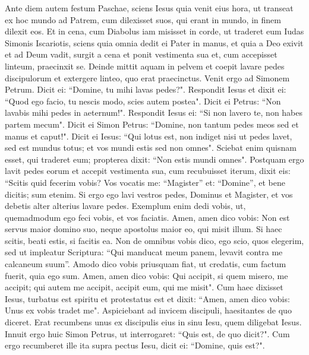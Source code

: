 \begin{biblechapter} 
\verse Ante diem autem festum Paschae, sciens Iesus quia venit eius hora, ut transeat ex hoc mundo ad Patrem, cum dilexisset suos, qui erant in mundo, in finem dilexit eos. 
\verse Et in cena, cum Diabolus iam misisset in corde, ut traderet eum Iudas Simonis Iscariotis, 
\verse sciens quia omnia dedit ei Pater in manus, et quia a Deo exivit et ad Deum vadit, 
\verse surgit a cena et ponit vestimenta sua et, cum accepisset linteum, praecinxit se. 
\verse Deinde mittit aquam in pelvem et coepit lavare pedes discipulorum et extergere linteo, quo erat praecinctus. 
\verse Venit ergo ad Simonem Petrum. Dicit ei: “Domine, tu mihi lavas pedes?". 
\verse Respondit Iesus et dixit ei: “Quod ego facio, tu nescis modo, scies autem postea". 
\verse Dicit ei Petrus: “Non lavabis mihi pedes in aeternum!". Respondit Iesus ei: “Si non lavero te, non habes partem mecum". 
\verse Dicit ei Simon Petrus: “Domine, non tantum pedes meos sed et manus et caput!". 
\verse Dicit ei Iesus: “Qui lotus est, non indiget nisi ut pedes lavet, sed est mundus totus; et vos mundi estis sed non omnes". 
\verse Sciebat enim quisnam esset, qui traderet eum; propterea dixit: “Non estis mundi omnes". 
\verse Postquam ergo lavit pedes eorum et accepit vestimenta sua, cum recubuisset iterum, dixit eis: “Scitis quid fecerim vobis? 
\verse Vos vocatis me: “Magister” et: “Domine”, et bene dicitis; sum etenim. 
\verse Si ergo ego lavi vestros pedes, Dominus et Magister, et vos debetis alter alterius lavare pedes.  
\verse Exemplum enim dedi vobis, ut, quemadmodum ego feci vobis, et vos faciatis.  
\verse Amen, amen dico vobis: Non est servus maior domino suo, neque apostolus maior eo, qui misit illum. 
\verse Si haec scitis, beati estis, si facitis ea. 
\verse Non de omnibus vobis dico, ego scio, quos elegerim, sed ut impleatur Scriptura: “Qui manducat meum panem, levavit contra me calcaneum suum”. 
\verse Amodo dico vobis priusquam fiat, ut credatis, cum factum fuerit, quia ego sum. 
\verse Amen, amen dico vobis: Qui accipit, si quem misero, me accipit; qui autem me accipit, accipit eum, qui me misit". 
\verse Cum haec dixisset Iesus, turbatus est spiritu et protestatus est et dixit: “Amen, amen dico vobis: Unus ex vobis tradet me". 
\verse Aspiciebant ad invicem discipuli, haesitantes de quo diceret. 
\verse Erat recumbens unus ex discipulis eius in sinu Iesu, quem diligebat Iesus. 
\verse Innuit ergo huic Simon Petrus, ut interrogaret: “Quis est, de quo dicit?". 
\verse Cum ergo recumberet ille ita supra pectus Iesu, dicit ei: “Domine, quis est?". 

\end{biblechapter}
